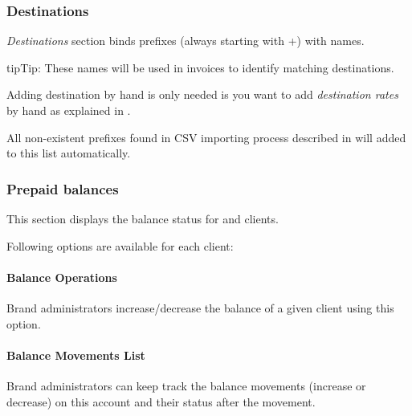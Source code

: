 \documentclass[letterpaper,10pt,english]{sphinxmanual}
\begin{document}
\subsubsection{Destinations}
\label{administration_portal/brand/billing/destinations::doc}\label{administration_portal/brand/billing/destinations:destinations}
\emph{Destinations} section binds prefixes (always starting with +) with names.

\begin{notice}{tip}{Tip:}
These names will be used in invoices to identify matching destinations.
\end{notice}

Adding destination by hand is only needed is you want to add \emph{destination rates} by hand as explained in {\hyperref[administration_portal/brand/billing/destination_rates:add\string-rates\string-manually]{}}.

All non-existent prefixes found in CSV importing process described in {\hyperref[administration_portal/brand/billing/destination_rates:importing\string-a\string-csv\string-file]{}} will added to this list
automatically.


\subsubsection{Prepaid balances}
\label{administration_portal/brand/billing/prepaid_balances::doc}\label{administration_portal/brand/billing/prepaid_balances:prepaid-balances}
This section displays the balance status for {\hyperref[administration_portal/brand/billing/index:prepaid\string-billing]{}} and {\hyperref[administration_portal/brand/billing/index:pseudo\string-prepaid\string-billing]{}} clients.

Following options are available for each client:


\paragraph{Balance Operations}
\label{administration_portal/brand/billing/prepaid_balances:balance-operations}
Brand administrators increase/decrease the balance of a given client using this option.


\paragraph{Balance Movements List}
\label{administration_portal/brand/billing/prepaid_balances:balance-movements-list}
Brand administrators can keep track the balance movements (increase or decrease) on this account and their status
after the movement.
\end{document}
